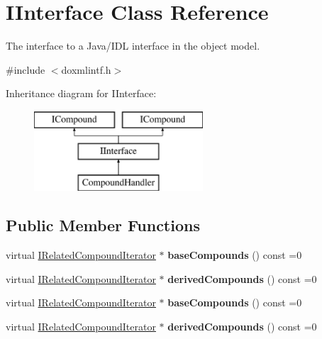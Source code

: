 \hypertarget{class_i_interface}{}\section{I\+Interface Class Reference}
\label{class_i_interface}


The interface to a Java/\+I\+DL interface in the object model.  




{\ttfamily \#include $<$doxmlintf.\+h$>$}

Inheritance diagram for I\+Interface\+:\begin{figure}[H]
\begin{center}
\leavevmode
\includegraphics[height=3.000000cm]{class_i_interface}
\end{center}
\end{figure}
\subsection*{Public Member Functions}
\begin{DoxyCompactItemize}
\item 
\mbox{\label{class_i_interface_a60ba6de1a4dd4ae229ae9fbf8759918a}} 
virtual \mbox{\hyperlink{class_i_related_compound_iterator}{I\+Related\+Compound\+Iterator}} $\ast$ {\bfseries base\+Compounds} () const =0
\item 
\mbox{\label{class_i_interface_a2e5ebe2599ba065b2a734377855fdc83}} 
virtual \mbox{\hyperlink{class_i_related_compound_iterator}{I\+Related\+Compound\+Iterator}} $\ast$ {\bfseries derived\+Compounds} () const =0
\item 
\mbox{\label{class_i_interface_a60ba6de1a4dd4ae229ae9fbf8759918a}} 
virtual \mbox{\hyperlink{class_i_related_compound_iterator}{I\+Related\+Compound\+Iterator}} $\ast$ {\bfseries base\+Compounds} () const =0
\item 
\mbox{\label{class_i_interface_a2e5ebe2599ba065b2a734377855fdc83}} 
virtual \mbox{\hyperlink{class_i_related_compound_iterator}{I\+Related\+Compound\+Iterator}} $\ast$ {\bfseries derived\+Compounds} () const =0
\end{DoxyCompactItemize}

